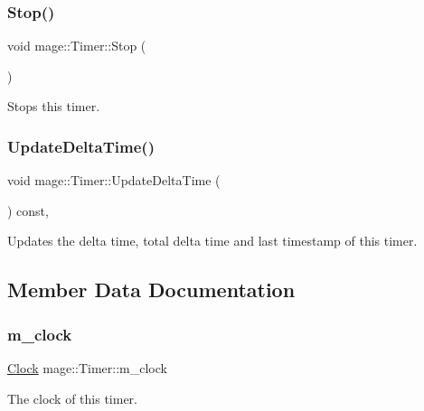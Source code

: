 \subsubsection{\texorpdfstring{Stop()}{Stop()}}
{\footnotesize\ttfamily void mage\+::\+Timer\+::\+Stop (\begin{DoxyParamCaption}{ }\end{DoxyParamCaption})\hspace{0.3cm}{\ttfamily [noexcept]}}

Stops this timer. \hypertarget{classmage_1_1_timer_a10f12ad8645e8022a09067f1393c065b}{}\label{classmage_1_1_timer_a10f12ad8645e8022a09067f1393c065b} 
\subsubsection{\texorpdfstring{Update\+Delta\+Time()}{UpdateDeltaTime()}}
{\footnotesize\ttfamily void mage\+::\+Timer\+::\+Update\+Delta\+Time (\begin{DoxyParamCaption}{ }\end{DoxyParamCaption}) const\hspace{0.3cm}{\ttfamily [private]}, {\ttfamily [noexcept]}}

Updates the delta time, total delta time and last timestamp of this timer. 

\subsection{Member Data Documentation}
\hypertarget{classmage_1_1_timer_aa85148d55792c8cc703918beede17215}{}\label{classmage_1_1_timer_aa85148d55792c8cc703918beede17215} 
\subsubsection{\texorpdfstring{m\+\_\+clock}{m\_clock}}
{\footnotesize\ttfamily \hyperlink{classmage_1_1_timer_a6d46c5edc40fd404d44d8762c814c5f3}{Clock} mage\+::\+Timer\+::m\+\_\+clock\hspace{0.3cm}{\ttfamily [private]}}

The clock of this timer. \hypertarget{classmage_1_1_timer_a05eac9cb442358351b0f2861f70e56b9}{}\label{classmage_1_1_timer_a05eac9cb442358351b0f2861f70e56b9} 
